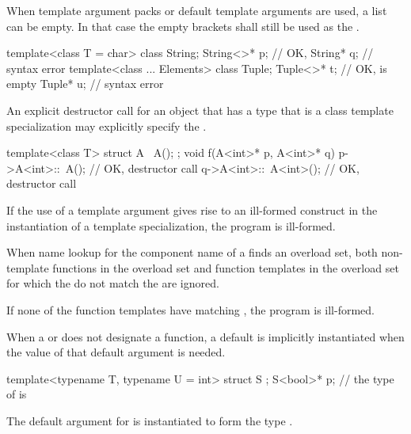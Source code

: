\pnum
When template argument packs or default template arguments are used,
a  list can be empty.
In that case the empty
\tcode{<>}
brackets shall still be used as the
.
\begin{example}
\begin{codeblock}
template<class T = char> class String;
String<>* p;                    // OK, 
String* q;                      // syntax error
template<class ... Elements> class Tuple;
Tuple<>* t;                     // OK,  is empty
Tuple* u;                       // syntax error
\end{codeblock}
\end{example}

\pnum
An explicit destructor call for an object that has a type
that is a class template specialization may explicitly specify the
.
\begin{example}
\begin{codeblock}
template<class T> struct A {
  ~A();
};
void f(A<int>* p, A<int>* q) {
  p->A<int>::~A();              // OK, destructor call
  q->A<int>::~A<int>();         // OK, destructor call
}
\end{codeblock}
\end{example}

\pnum
If the use of a template argument
gives rise to an ill-formed construct in the instantiation of a
template specialization, the program is ill-formed.

\pnum
When name lookup for the component name of a
finds an overload set, both non-template functions in the overload
set and function templates in the overload set for
which the
do not match the
are ignored.
\begin{note}
If none of the function templates have matching
,
the program is ill-formed.
\end{note}

\pnum
When a  or
does not designate a function,
a default  is
implicitly instantiated
when the value of that default argument is needed.
\begin{example}
\begin{codeblock}
template<typename T, typename U = int> struct S { };
S<bool>* p;         // the type of  is 
\end{codeblock}
The default argument for  is instantiated to form the type .
\end{example}

